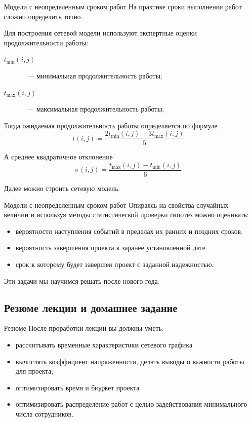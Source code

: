 \documentclass[unicode,11pt,notheorems]{beamer}
\begin{document}
 
\begin{frame}{Модели с неопределенным сроком работ}
На практике сроки выполнения работ сложно определить точно.

Для построения сетевой модели используют экспертные оценки продолжительности работы:
\begin{description}
\item[$t_{\min}(i,j)$]~--- минимальная продолжительность работы;
\item[$t_{\max}(i,j)$]~--- максимальная продолжительность работы;
\end{description}
Тогда ожидаемая продолжительность работы определяется по формуле
$$
t(i,j)= \frac{2t_{\min}(i,j)+3t_{\max}(i,j)}{5}
$$

А среднее  квадратичное отклонение
$$
\sigma(i,j)= \frac{t_{\max}(i,j)-t_{\min}(i,j)}{6}
$$

Далее можно строить сетевую модель.
\end{frame}

\begin{frame}{Модели с неопределенным сроком работ}
Опираясь на свойства  случайных величин
и используя методы статистической проверки гипотез можно оценивать: 
\begin{itemize}
\item 
	вероятности наступления событий в пределах их ранних и поздних сроков,
\item 
	вероятность завершения проекта к заранее установленной дате
\item 
	срок к которому будет завершен проект с заданной надежностью.
\end{itemize}


\begin{exampleblock}{}
Эти задачи мы научимся решать после нового года.
\end{exampleblock}
\end{frame}





\subsection{Резюме лекции и домашнее задание}
\begin{frame}{Резюме}
	После проработки лекции вы должны уметь:
	\begin{itemize}
	\item 
		рассчитывать временные характеристики сетевого графика
	\item 
		вычислять коэффициент напряженности, делать выводы о важности работы для проекта;
	\item 
		оптимизировать время и бюджет проекта
	\item 
		оптимизировать распределение работ с целью задействования минимального числа сотрудников.
	\end{itemize}		
\end{frame}
\end{document}
